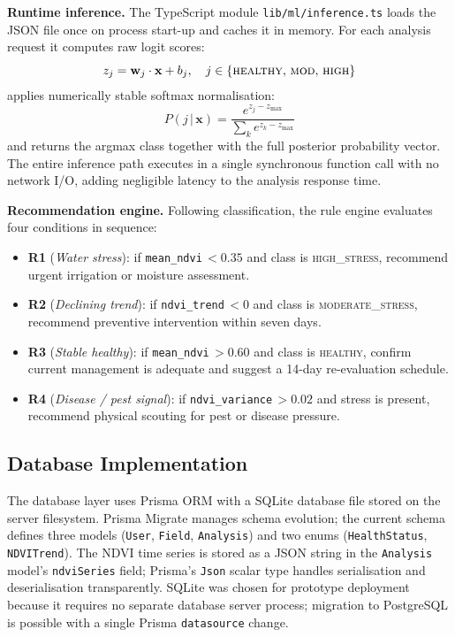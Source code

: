 \documentclass[conference]{IEEEtran}
\begin{document}
\textbf{Runtime inference.} The TypeScript module
\texttt{lib/ml/inference.ts} loads the JSON file once on process start-up
and caches it in memory. For each analysis request it computes raw logit
scores:
\begin{equation}
  z_j = \mathbf{w}_j \cdot \mathbf{x} + b_j, \quad
  j \in \{\textsc{healthy},\,\textsc{mod},\,\textsc{high}\}
\end{equation}
applies numerically stable softmax normalisation:
\begin{equation}
  P(j\,|\,\mathbf{x}) = \frac{e^{z_j - z_{\max}}}
    {\sum_{k} e^{z_k - z_{\max}}}
\end{equation}
and returns the argmax class together with the full posterior probability
vector. The entire inference path executes in a single synchronous
function call with no network I/O, adding negligible latency to the
analysis response time.

\textbf{Recommendation engine.} Following classification, the rule engine
evaluates four conditions in sequence:
\begin{itemize}
\item \textbf{R1} (\textit{Water stress}): if \texttt{mean\_ndvi}\,$< 0.35$
  and class is \textsc{high\_stress}, recommend urgent irrigation or
  moisture assessment.
\item \textbf{R2} (\textit{Declining trend}): if \texttt{ndvi\_trend}\,$< 0$
  and class is \textsc{moderate\_stress}, recommend preventive
  intervention within seven days.
\item \textbf{R3} (\textit{Stable healthy}): if \texttt{mean\_ndvi}\,$> 0.60$
  and class is \textsc{healthy}, confirm current management is adequate
  and suggest a 14-day re-evaluation schedule.
\item \textbf{R4} (\textit{Disease / pest signal}): if
  \texttt{ndvi\_variance}\,$> 0.02$ and stress is present, recommend
  physical scouting for pest or disease pressure.
\end{itemize}

\subsection{Database Implementation}

The database layer uses Prisma ORM with a SQLite database file stored on
the server filesystem. Prisma Migrate manages schema evolution; the
current schema defines three models (\texttt{User}, \texttt{Field},
\texttt{Analysis}) and two enums (\texttt{HealthStatus},
\texttt{NDVITrend}). The NDVI time series is stored as a JSON string in
the \texttt{Analysis} model's \texttt{ndviSeries} field; Prisma's
\texttt{Json} scalar type handles serialisation and deserialisation
transparently. SQLite was chosen for prototype deployment because it
requires no separate database server process; migration to PostgreSQL
is possible with a single Prisma \texttt{datasource} change.
\end{document}
